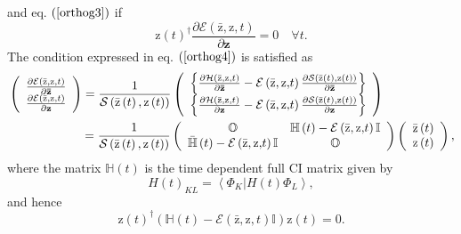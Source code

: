 \documentclass[aps,preprint]{revtex4}%
\begin{document}
and eq. $\left(  \ref{orthog3}\right)  $ if
\begin{equation}
\mathrm{z}\left(  t\right)  ^{\dagger}\frac{\partial\mathcal{E}\left(
\mathrm{\bar{z},z}\mathbf{,}t\right)  }{\partial\mathbf{z}}=0\quad\forall t.
\label{orthog4}%
\end{equation}
The condition expressed in eq. $\left(  \ref{orthog4}\right)  $ is satisfied
as
\begin{align}
&  \left(
\begin{array}
[c]{c}%
\frac{\partial\mathcal{E}\left(  \mathrm{\bar{z},z}\mathbf{,}t\right)
}{\partial\mathbf{\bar{z}}}\\
\frac{\partial\mathcal{E}\left(  \mathrm{\bar{z},z}\mathbf{,}t\right)
}{\partial\mathbf{z}}%
\end{array}
\right)  =\frac{1}{\mathcal{S}\left(  \mathrm{\bar{z}}\left(  t\right)
\mathrm{,z}\left(  t\right)  \right)  }\left(
\begin{array}
[c]{c}%
\left\{  \frac{\partial\mathcal{H}\left(  \mathrm{\bar{z},z}\mathbf{,}%
t\right)  }{\partial\mathbf{\bar{z}}}-\mathcal{E}\left(  \mathrm{\bar{z}%
,z}\mathbf{,}t\right)  \frac{\partial\mathcal{S}\left(  \mathrm{\bar{z}%
}\left(  t\right)  ,\mathrm{z}\left(  t\right)  \right)  }{\partial
\mathbf{\bar{z}}}\right\} \\
\left\{  \frac{\partial\mathcal{H}\left(  \mathrm{\bar{z},z}\mathbf{,}%
t\right)  }{\partial\mathbf{z}}-\mathcal{E}\left(  \mathrm{\bar{z}%
,z}\mathbf{,}t\right)  \frac{\partial\mathcal{S}\left(  \mathrm{\bar{z}%
}\left(  t\right)  ,\mathrm{z}\left(  t\right)  \right)  }{\partial\mathbf{z}%
}\right\}
\end{array}
\right) \nonumber\\
&  \qquad\qquad\qquad\left.  =\right.  \frac{1}{\mathcal{S}\left(
\mathrm{\bar{z}}\left(  t\right)  \mathrm{,z}\left(  t\right)  \right)
}\left(
\begin{array}
[c]{cc}%
\mathbb{O} & \mathbb{H}\left(  t\right)  -\mathcal{E}\left(  \mathrm{\bar
{z},z}\mathbf{,}t\right)  \mathbb{I}\\
\mathbb{\bar{H}}\left(  t\right)  -\mathcal{E}\left(  \mathrm{\bar{z}%
,z}\mathbf{,}t\right)  \mathbb{I} & \mathbb{O}%
\end{array}
\right)  \left(
\begin{array}
[c]{c}%
\mathrm{\bar{z}}\left(  t\right) \\
\mathrm{z}\left(  t\right)
\end{array}
\right)  ,
\end{align}
where the matrix $\mathbb{H}\left(  t\right)  $ is the time dependent full CI
matrix given by
\begin{equation}
H\left(  t\right)  _{KL}=\left\langle \Phi_{K}\mathbf{|}H\left(  t\right)
\Phi_{L}\right\rangle ,
\end{equation}
and hence
\begin{equation}
\mathrm{z}\left(  t\right)  ^{\dag}\left(  \mathbb{H}\left(  t\right)
-\mathcal{E}\left(  \mathrm{\bar{z},z}\mathbf{,}t\right)  \mathbb{I}\right)
\mathrm{z}\left(  t\right)  =0.
\end{equation}
%
\end{document}
